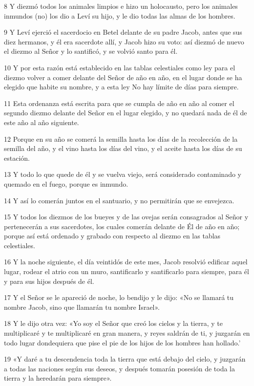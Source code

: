 \par 8 Y diezmó todos los animales limpios e hizo un holocausto, pero los animales inmundos (no) los dio a Leví su hijo, y le dio todas las almas de los hombres.
\par 9 Y Leví ejerció el sacerdocio en Betel delante de su padre Jacob, antes que sus diez hermanos, y él era sacerdote allí, y Jacob hizo su voto: así diezmó de nuevo el diezmo al Señor y lo santificó, y se volvió santo para él.
\par 10 Y por esta razón está establecido en las tablas celestiales como ley para el diezmo volver a comer delante del Señor de año en año, en el lugar donde se ha elegido que habite su nombre, y a esta ley No hay límite de días para siempre.
\par 11 Esta ordenanza está escrita para que se cumpla de año en año al comer el segundo diezmo delante del Señor en el lugar elegido, y no quedará nada de él de este año al año siguiente.
\par 12 Porque en su año se comerá la semilla hasta los días de la recolección de la semilla del año, y el vino hasta los días del vino, y el aceite hasta los días de su estación.
\par 13 Y todo lo que quede de él y se vuelva viejo, será considerado contaminado y quemado en el fuego, porque es inmundo.
\par 14 Y así lo comerán juntos en el santuario, y no permitirán que se envejezca.
\par 15 Y todos los diezmos de los bueyes y de las ovejas serán consagrados al Señor y pertenecerán a sus sacerdotes, los cuales comerán delante de Él de año en año; porque así está ordenado y grabado con respecto al diezmo en las tablas celestiales.
\par 16 Y la noche siguiente, el día veintidós de este mes, Jacob resolvió edificar aquel lugar, rodear el atrio con un muro, santificarlo y santificarlo para siempre, para él y para sus hijos después de él.
\par 17 Y el Señor se le apareció de noche, lo bendijo y le dijo: «No se llamará tu nombre Jacob, sino que llamarán tu nombre Israel».
\par 18 Y le dijo otra vez: «Yo soy el Señor que creó los cielos y la tierra, y te multiplicaré y te multiplicaré en gran manera, y reyes saldrán de ti, y juzgarán en todo lugar dondequiera que pise el pie de los hijos de los hombres han hollado.'
\par 19 «Y daré a tu descendencia toda la tierra que está debajo del cielo, y juzgarán a todas las naciones según sus deseos, y después tomarán posesión de toda la tierra y la heredarán para siempre».
